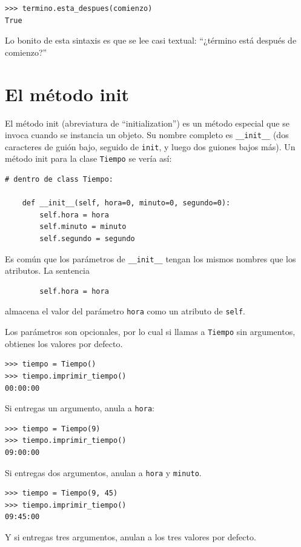 \documentclass[10pt]{book}
\begin{document}
\begin{verbatim}
>>> termino.esta_despues(comienzo)
True
\end{verbatim}
%
Lo bonito de esta sintaxis es que se lee
casi textual: ``¿término está después de comienzo?''


\section{El método init}

El método init (abreviatura de ``initialization'') es
un método especial que se invoca cuando se instancia un objeto.
Su nombre completo es \verb"__init__" (dos caracteres de guión bajo,
seguido de {\tt init}, y luego dos guiones bajos más).  Un
método init para la clase {\tt Tiempo} se vería así:

\begin{verbatim}
# dentro de class Tiempo:

    def __init__(self, hora=0, minuto=0, segundo=0):
        self.hora = hora
        self.minuto = minuto
        self.segundo = segundo
\end{verbatim}
%
Es común que los parámetros de \verb"__init__"
tengan los mismos nombres que los atributos.  La sentencia

\begin{verbatim}
        self.hora = hora
\end{verbatim}
%
almacena el valor del parámetro {\tt hora} como un atributo
de {\tt self}.

Los parámetros son opcionales, por lo cual si llamas a {\tt Tiempo} sin
argumentos, obtienes los valores por defecto.

\begin{verbatim}
>>> tiempo = Tiempo()
>>> tiempo.imprimir_tiempo()
00:00:00
\end{verbatim}
%
Si entregas un argumento, anula a {\tt hora}:

\begin{verbatim}
>>> tiempo = Tiempo(9)
>>> tiempo.imprimir_tiempo()
09:00:00
\end{verbatim}
%
Si entregas dos argumentos, anulan a {\tt hora} y
{\tt minuto}.

\begin{verbatim}
>>> tiempo = Tiempo(9, 45)
>>> tiempo.imprimir_tiempo()
09:45:00
\end{verbatim}
%
Y si entregas tres argumentos, anulan a los tres
valores por defecto.
\end{document}
